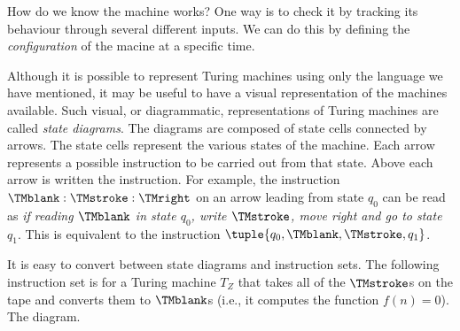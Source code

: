 \documentclass[../../include/open-logic-section]{subfiles}
\begin{document}




How do we know the machine works? One way is to check it by tracking
its behaviour through several different inputs. We can do this by defining
the \emph{configuration} of the macine at a specific time.





\begin{explain}
Although it is possible to represent Turing machines using only the
language we have mentioned, it may be useful to have a visual
representation of the machines available. Such visual, or
diagrammatic, representations of Turing machines are called
\emph{state diagrams}. The diagrams are composed of state cells
connected by arrows. The state cells represent the various states of
the machine. Each arrow represents a possible instruction to be
carried out from that state. Above each arrow is written the
instruction. For example, the instruction $\TMblank :\TMstroke
:\TMright$ on an arrow leading from state $q_0$ can be read as
\emph{if reading $\TMblank$ in state $q_0$, write $\TMstroke$, move
  right and go to state $q_1$}. This is equivalent to the instruction
$\tuple{q_0, \TMblank, \TMstroke, q_1}$.

It is easy to convert between state diagrams and instruction sets. The
following instruction set is for a Turing machine $T_Z$ that takes all
of the $\TMstroke$s on the tape and converts them to $\TMblank$s
(i.e., it computes the function $f(n) = 0$). The diagram.
\end{explain}
\end{document}
